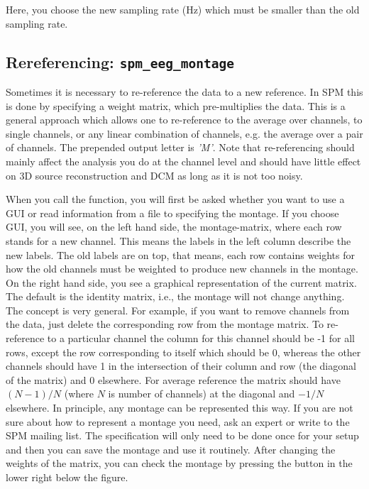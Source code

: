 Here, you choose the new sampling rate (Hz) which must be smaller than the old sampling rate.

\subsection{Rereferencing: \texttt{spm\_eeg\_montage}}
Sometimes it is necessary to re-reference the data to a new reference. In SPM this is done by specifying a weight matrix, which pre-multiplies the data. This is a general approach which allows one to re-reference to the average over channels, to single channels, or any linear combination of channels, e.g. the average over a pair of channels. The prepended output letter is \textit{'M'}. Note that re-referencing should mainly affect the analysis you do at the channel level and should have little effect on 3D source reconstruction and DCM as long as it is not too noisy.

When you call the function, you will first be asked whether you want to use a GUI or read information from a file to specifying the montage. If you choose GUI, you will see, on the left hand side, the montage-matrix, where each row stands for a new channel. This means the labels in the left column describe the new labels. The old labels are on top, that means, each row contains weights for how the old channels must be weighted to produce new channels in the montage. On the right hand side, you see a graphical representation of the current matrix. The default is the identity matrix, i.e., the montage will not change anything. The concept is very general. For example, if you want to remove channels from the data, just delete the corresponding row from the montage matrix. To re-reference to a particular channel the column for this channel should be -1 for all rows, except the row corresponding to itself which should be 0, whereas the other channels should have 1 in the intersection of their column and row (the diagonal of the matrix) and 0 elsewhere. For average reference the matrix should have $(N-1)/N$ (where $N$ is number of channels) at the diagonal and $-1/N$ elsewhere. In principle, any montage can be represented this way. If you are not sure about how to represent a montage you need, ask an expert or write to the SPM mailing list. The specification will only need to be done once for your setup and then you can save the montage and use it routinely. After changing the weights of the matrix, you can check the montage by pressing the button in the lower right below the figure.

